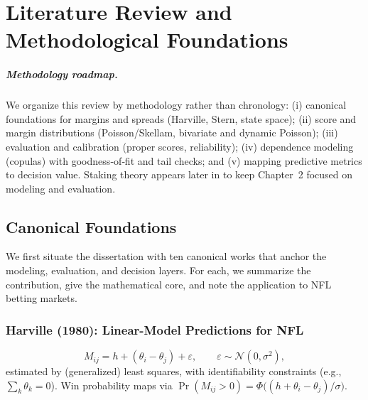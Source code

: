 \chapter{Literature Review and Methodological Foundations}
\label{chap:litreview}

\paragraph{Methodology roadmap.} We organize this review by methodology rather than chronology: (i) canonical foundations for margins and spreads (Harville, Stern, state space); (ii) score and margin distributions (Poisson/Skellam, bivariate and dynamic Poisson); (iii) evaluation and calibration (proper scores, reliability); (iv) dependence modeling (copulas) with goodness‑of‑fit and tail checks; and (v) mapping predictive metrics to decision value. Staking theory appears later in  to keep Chapter~2 focused on modeling and evaluation.

\section{Canonical Foundations}
We first situate the dissertation with ten canonical works that anchor the modeling, evaluation, and decision layers. For each, we summarize the contribution, give the mathematical core, and note the application to NFL betting markets.

\subsection{Harville (1980): Linear-Model Predictions for NFL} \label{subsec:harville1980}
\begin{equation}\label{eq:harville}
M_{ij} = h + (\theta_i - \theta_j) + \varepsilon,\qquad \varepsilon\sim \mathcal N(0,\sigma^2),
\end{equation}
estimated by (generalized) least squares, with identifiability constraints (e.g., $\sum_k \theta_k=0$). Win probability maps via $\Pr(M_{ij}>0)=\Phi\big((h+\theta_i-\theta_j)/\sigma\big)$.

